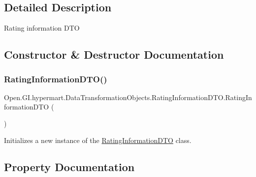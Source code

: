 \subsection{Detailed Description}
Rating information D\+TO 



\subsection{Constructor \& Destructor Documentation}
\hypertarget{class_open_1_1_g_i_1_1hypermart_1_1_data_transformation_objects_1_1_rating_information_d_t_o_a51c542e9651681efa2e577a9d02195c6}{}\label{class_open_1_1_g_i_1_1hypermart_1_1_data_transformation_objects_1_1_rating_information_d_t_o_a51c542e9651681efa2e577a9d02195c6} 
\subsubsection{\texorpdfstring{Rating\+Information\+D\+T\+O()}{RatingInformationDTO()}}
{\footnotesize\ttfamily Open.\+G\+I.\+hypermart.\+Data\+Transformation\+Objects.\+Rating\+Information\+D\+T\+O.\+Rating\+Information\+D\+TO (\begin{DoxyParamCaption}{ }\end{DoxyParamCaption})}



Initializes a new instance of the \hyperlink{class_open_1_1_g_i_1_1hypermart_1_1_data_transformation_objects_1_1_rating_information_d_t_o}{Rating\+Information\+D\+TO} class. 



\subsection{Property Documentation}
\hypertarget{class_open_1_1_g_i_1_1hypermart_1_1_data_transformation_objects_1_1_rating_information_d_t_o_a75cc38ad71428e87e97db4d9c1deb672}{}\label{class_open_1_1_g_i_1_1hypermart_1_1_data_transformation_objects_1_1_rating_information_d_t_o_a75cc38ad71428e87e97db4d9c1deb672} 
